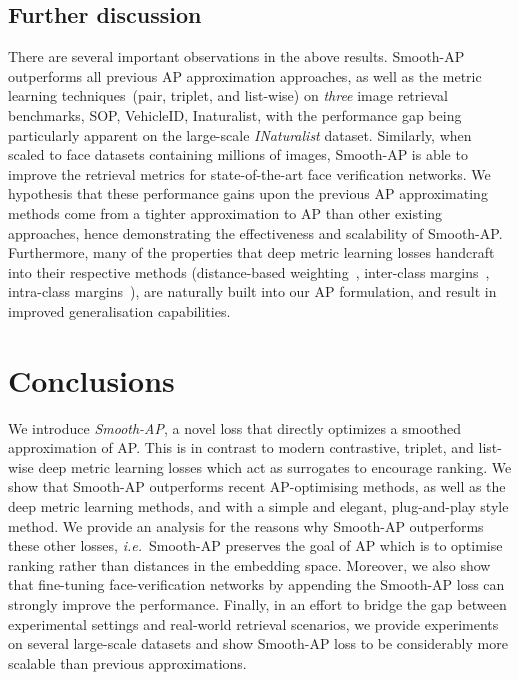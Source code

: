 \documentclass[runningheads]{llncs}
\providecommand{\ie}[0]{\emph{i.e.}}
\begin{document}
\subsection{Further discussion}
\label{sub:discussion}
There are several important observations in the above results. 
Smooth-AP outperforms all previous AP approximation approaches, 
as well as the metric learning techniques~(pair, triplet, and list-wise) on \emph{three} image retrieval benchmarks, 
SOP, VehicleID, Inaturalist,
with the performance gap being particularly apparent on the large-scale \textit{INaturalist} dataset.
Similarly, when scaled to face datasets containing millions of images, 
Smooth-AP is able to improve the retrieval metrics for state-of-the-art face verification networks.
We hypothesis that these performance gains upon the previous AP approximating methods come from a tighter approximation to AP than other existing approaches,
hence demonstrating the effectiveness and scalability of Smooth-AP.
Furthermore, many of the properties that deep metric learning losses handcraft into their respective methods (distance-based weighting~\cite{Song16,Wu17}, 
inter-class margins~\cite{Chopra05,Schroff15,Song16,Wang19ranked}, 
intra-class margins~\cite{Wang19ranked}), are naturally built into our AP formulation, 
and result in improved generalisation capabilities.


 \label{sec:experimental_results}


\section{Conclusions}
We introduce \textit{Smooth-AP}, 
a novel loss that directly optimizes a smoothed approximation of AP. 
This is in contrast to modern contrastive, 
triplet, and list-wise deep metric learning losses which act as surrogates to encourage ranking.  
We show that Smooth-AP outperforms recent AP-optimising methods, 
as well as the deep metric learning methods, 
and with a simple and elegant, plug-and-play style method. 
We provide an analysis for the reasons why Smooth-AP outperforms these other losses, 
\ie~Smooth-AP preserves the goal of AP which is to optimise ranking rather than distances in the embedding space. 
Moreover, we also show that fine-tuning face-verification networks by appending the Smooth-AP loss 
can strongly improve the performance. 
Finally, in an effort to bridge the gap between experimental settings and real-world retrieval scenarios, 
we provide experiments on several large-scale datasets and 
show Smooth-AP loss to be considerably more scalable than previous approximations.
\end{document}
